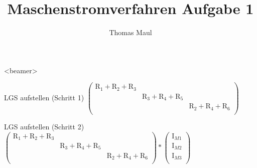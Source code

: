 \documentclass[aspectratio=169, ignorenonframetext]{beamer}
\title{Maschenstromverfahren  Aufgabe 1}
\institute[BWS Hofheim]{Brühlwiesenschule, Hofheim}
\author{Thomas Maul}
\begin{document}
  \begin{frame}<beamer>
    \titlepage
  \end{frame}



\begin{frame}{LGS aufstellen (Schritt 1)}
$\left( \begin{array}{lll}
\text{R}_1+\text{R}_2+\text{R}_3 & & \\
& \text{R}_3+\text{R}_4+\text{R}_5 & \\
&&\text{R}_2 + \text{R}_4 + \text{R}_6 \\
\end{array}\right)
$
\end{frame}

\begin{frame}{LGS aufstellen (Schritt 2)}
$\left( \begin{array}{lll}
\text{R}_1+\text{R}_2+\text{R}_3 & & \\
& \text{R}_3+\text{R}_4+\text{R}_5 & \\
&&\text{R}_2 + \text{R}_4 + \text{R}_6 \\
\end{array}\right) *
\left(\begin{array}{c}
  \text{I}_{M1}\\
  \text{I}_{M2}\\
  \text{I}_{M3}\\
     \end{array} \right)
$
\end{frame}
\end{document}
